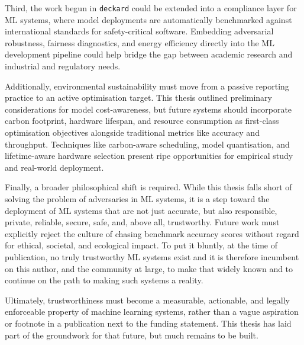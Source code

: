 Third, the work begun in \texttt{deckard} could be extended into a compliance layer for ML systems, where model deployments are automatically benchmarked against international standards for safety-critical software.
Embedding adversarial robustness, fairness diagnostics, and energy efficiency directly into the ML development pipeline could help bridge the gap between academic research and industrial and regulatory needs.

Additionally, environmental sustainability must move from a passive reporting practice to an active optimisation target.
This thesis outlined preliminary considerations for model cost-awareness, but future systems should incorporate carbon footprint, hardware lifespan, and resource consumption as first-class optimisation objectives alongside traditional metrics like accuracy and throughput.
Techniques like carbon-aware scheduling, model quantisation, and lifetime-aware hardware selection present ripe opportunities for empirical study and real-world deployment.

Finally, a broader philosophical shift is required.
While this thesis falls short of solving the problem of adversaries in ML systems, it is a step toward the deployment of ML systems that are not just accurate, but also responsible, private, reliable, secure, safe, and, above all, trustworthy.
Future work must explicitly reject the culture of chasing benchmark accuracy scores without regard for ethical, societal, and ecological impact.
To put it bluntly, at the time of publication, no truly trustworthy ML systems exist and it is therefore incumbent on this author, and the community at large, to make that widely known and to continue on the path to making such systems a reality.

Ultimately, trustworthiness must become a measurable, actionable, and legally enforceable property of machine learning systems, rather than a vague aspiration or footnote in a publication next to the funding statement. 
This thesis has laid part of the groundwork for that future, but much remains to be built.